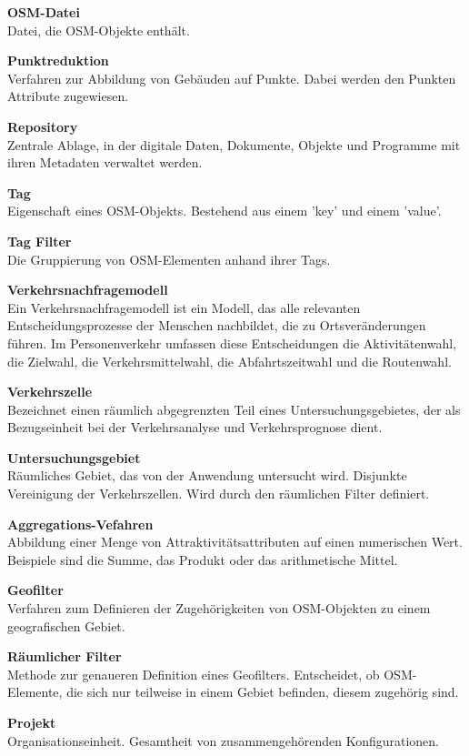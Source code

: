 \documentclass[parskip=full]{scrartcl} %
\begin{document}
\textbf{OSM-Datei}\\
Datei, die OSM-Objekte enthält.

\textbf{Punktreduktion}\\
Verfahren zur Abbildung von Gebäuden auf Punkte. Dabei werden den Punkten Attribute zugewiesen.

\textbf{Repository}\\
Zentrale Ablage, in der digitale Daten, Dokumente, Objekte und Programme mit ihren Metadaten verwaltet werden.

\textbf{Tag}\\
Eigenschaft eines OSM-Objekts. Bestehend aus einem 'key' und einem 'value'.

\textbf{Tag Filter}\\
Die Gruppierung von OSM-Elementen anhand ihrer Tags.

\textbf{Verkehrsnachfragemodell}\\
Ein Verkehrsnachfragemodell ist ein Modell, das alle relevanten Entscheidungsprozesse der Menschen nachbildet, die zu Ortsveränderungen führen. Im Personenverkehr umfassen diese Entscheidungen die Aktivitätenwahl, die Zielwahl, die Verkehrsmittelwahl, die Abfahrtszeitwahl und die Routenwahl.

\textbf{Verkehrszelle}\\
Bezeichnet einen räumlich abgegrenzten Teil eines Untersuchungsgebietes, der als Bezugseinheit bei der Verkehrsanalyse und Verkehrsprognose dient.

\textbf{Untersuchungsgebiet}\\
Räumliches Gebiet, das von der Anwendung untersucht wird. Disjunkte Vereinigung der Verkehrszellen. Wird durch den räumlichen Filter definiert.

\textbf{Aggregations-Vefahren}\\
Abbildung einer Menge von Attraktivitätsattributen auf einen numerischen Wert. Beispiele sind die Summe, das Produkt oder das arithmetische Mittel.

\textbf{Geofilter}\\
Verfahren zum Definieren der Zugehörigkeiten von OSM-Objekten zu einem geografischen Gebiet.

\textbf{Räumlicher Filter}\\
Methode zur genaueren Definition eines Geofilters. Entscheidet, ob OSM-Elemente, die sich nur teilweise in einem Gebiet befinden, diesem zugehörig sind.

\textbf{Projekt}\\
Organisationseinheit. Gesamtheit von zusammengehörenden Konfigurationen.
\end{document}
